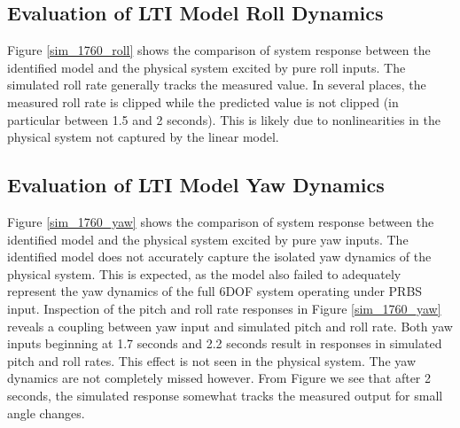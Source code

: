 \subsection{Evaluation of LTI Model Roll Dynamics}
Figure \ref{sim_1760_roll} shows the comparison of system response between the identified model and the physical system excited by pure roll inputs. The simulated roll rate generally tracks the measured value. In several places, the measured roll rate is clipped while the predicted value is not clipped (in particular between 1.5 and 2 seconds). This is likely due to nonlinearities in the physical system not captured by the linear model.


\subsection{Evaluation of LTI Model Yaw Dynamics}
Figure \ref{sim_1760_yaw} shows the comparison of system response between the identified model and the physical system excited by pure yaw inputs. The identified model does not accurately capture the isolated yaw dynamics of the physical system. This is expected, as the model also failed to adequately represent the yaw dynamics of the full 6DOF system operating under PRBS input. Inspection of the pitch and roll rate responses in Figure \ref{sim_1760_yaw} reveals a coupling between yaw input and simulated pitch and roll rate. Both yaw inputs beginning at 1.7 seconds and 2.2 seconds result in responses in simulated pitch and roll rates. This effect is not seen in the physical system. The yaw dynamics are not completely missed however. From Figure \label{sim_1760_20131017212626_31_38500} we see that after 2 seconds, the simulated response somewhat tracks the measured output for small angle changes.







